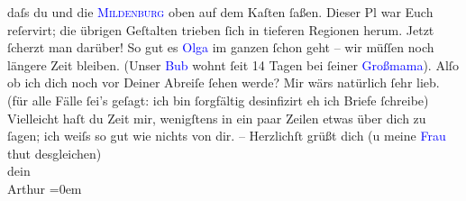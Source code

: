                daſs du und die \textcolor{blue}{\textsc{Mildenburg}}{}\ledrightnote{\textcolor{blue}{Anna Bahr-Mildenburg}} oben auf dem Kaſten ſaßen. Dieser Pl war Euch reſervirt; die übrigen Geſtalten trieben ſich in tieferen Regionen
               herum. Jetzt ſcherzt man darüber! So gut es \textcolor{blue}{Olga}{}\ledrightnote{\textcolor{blue}{Olga Schnitzler}}
               im ganzen ſchon geht – wir müſſen noch längere Zeit \label{K_L01743_1v}\label{K_L01743_1h} bleiben. (Unser \textcolor{blue}{Bub}{} wohnt ſeit 14 Tagen bei ſeiner \textcolor{blue}{Großmama}{}). Alſo ob ich dich noch vor Deiner
               Abreiſe ſehen werde? Mir wärs natürlich ſehr lieb. (für alle Fälle ſei’s geſagt: ich
               bin ſorg{\pb}fältig desinfizirt eh
               ich Briefe ſchreibe)\pend
           \pstart
           Vielleicht haſt du Zeit mir, wenigſtens in ein paar Zeilen etwas über dich zu ſagen;
               ich weiſs so gut wie nichts von dir. – \pend
           \pstart
           Herzlichſt grüßt dich (u meine \textcolor{blue}{Frau}{} thut desgleichen){\\[\baselineskip]}dein{\\[\baselineskip]}\spacefill\mbox{Arthur}\pend
           \leftskip=0em{}\endnumbering{}  
      